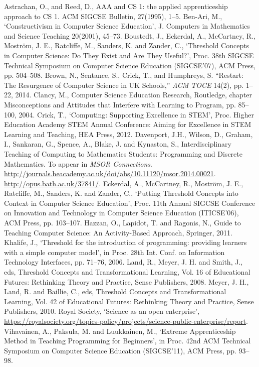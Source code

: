 \documentclass[conference,compsoc]{IEEEtran}
\begin{document}
\begin{thebibliography}{10}

Astrachan, O., and Reed, D., AAA and CS 1: the applied apprenticeship approach to CS 1. ACM SIGCSE Bulletin, 27(1995), 1--5.
Ben-Ari, M., `Constructivism in Computer Science Education', J. Computers in Mathematics and Science Teaching 20(2001), 45--73.
Boustedt, J., Eckerdal, A., McCartney, R.,
  Mostr\"om, J. E., Ratcliffe, M., Sanders, K. and Zander, C.,
  `Threshold Concepts in Computer Science: Do They Exist and Are They
  Useful?', Proc. 38th SIGCSE Technical Symposium on Computer Science
  Education (SIGCSE'07), ACM Press, pp. 504--508.
Brown, N., Sentance, S., Crick, T., and Humphreys, S. ``{Restart: The Resurgence
  of Computer Science in UK Schools},'' \emph{{ACM TOCE}} 14(2), pp.
  1--22, 2014.
Clancy, M., Computer Science Education Research,
  Routledge, chapter Misconceptions and Attitudes that Interfere with
  Learning to Program, pp. 85--100, 2004.
Crick, T., `Computing: Supporting Excellence in STEM', 
Proc. Higher Education Academy STEM Annual Conference: Aiming for
Excellence in STEM Learning and Teaching, HEA Press, 2012.
Davenport, J.H., Wilson, D., Graham, I., Sankaran, G., Spence, A., Blake, J. and Kynaston, S.,
Interdisciplinary Teaching of Computing to Mathematics Students:
Programming and Discrete Mathematics.
To appear in {\it MSOR Connections\/}.
\url{http://journals.heacademy.ac.uk/doi/abs/10.11120/msor.2014.00021}.
\url{http://opus.bath.ac.uk/37841/}.
Eckerdal, A., McCartney, R., Mostr\"om, J. E., Ratcliffe, M., Sanders, K. and Zander, C., `Putting Threshold Concepts into Context in Computer Science Education', Proc. 11th Annual SIGCSE Conference on Innovation and Technology in Computer Science Education (ITICSE'06), ACM Press, pp. 103--107.
Hazzan, O., Lapidot, T. and Ragonis, N., Guide to Teaching Computer Science: An Activity-Based Approach, Springer, 2011.
Khalife, J., `Threshold for the introduction of
  programming: providing learners with a simple computer model', in
  Proc. 28th Int. Conf. on Information Technology Interfaces,
  pp. 71--76, 2006.
Land, R., Meyer, J. H. and Smith, J., eds, Threshold Concepts and Transformational Learning, Vol. 16 of Educational Futures: Rethinking Theory and Practice, Sense Publishers, 2008.
Meyer, J. H., Land, R. and Baillie, C., eds, Threshold Concepts and Transformational Learning, Vol. 42 of Educational Futures: Rethinking Theory and Practice, Sense Publishers, 2010.
Royal Society, `Science as an open enterprise', \url{https://royalsociety.org/topics-policy/projects/science-public-enterprise/report}.
Vihavainen, A., Paksula, M. and Luukkainen, M., `Extreme Apprenticeship Method in Teaching Programming for Beginners', in Proc. 42nd ACM Technical Symposium on Computer Science Education (SIGCSE'11), ACM Press, pp. 93--98.


\end{thebibliography}
\end{document}
